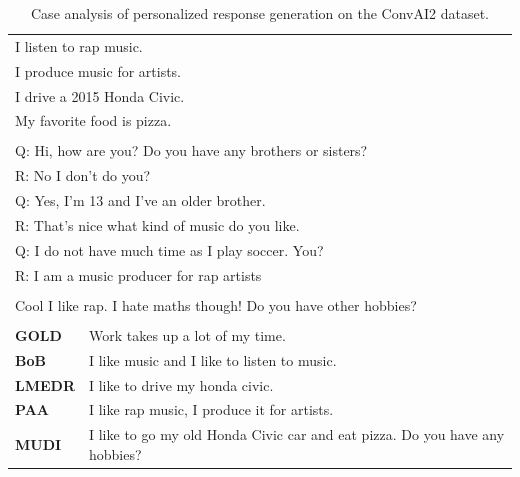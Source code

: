 
\begin{table}[ht]
\centering
\def\arraystretch{1.6}%
\begin{tabular}{|l|p{11cm}|}

\hline
\rowcolor{yellow}
\multicolumn{2}{|c|}{\textbf{Persona}} \\
\hline
\multicolumn{2}{|l|}{I listen to rap music.} \\
\multicolumn{2}{|l|}{I produce music for artists.} \\
\multicolumn{2}{|l|}{I drive a 2015 Honda Civic.} \\
\multicolumn{2}{|l|}{My favorite food is pizza.} \\
\hline

\rowcolor{yellow}
\multicolumn{2}{|c|}{\textbf{Context}} \\
\hline
\multicolumn{2}{|l|}{Q: Hi, how are you? Do you have any brothers or sisters?} \\
\multicolumn{2}{|l|}{R: No I don't do you?} \\
\multicolumn{2}{|l|}{Q: Yes, I'm 13 and I've an older brother.} \\
\multicolumn{2}{|l|}{R: That's nice what kind of music do you like.} \\
\multicolumn{2}{|l|}{Q: I do not have much time as I play soccer. You?} \\
\multicolumn{2}{|l|}{R: I am a music producer for rap artists} \\
\hline

\rowcolor{yellow}
\multicolumn{2}{|c|}{\textbf{Query}} \\
\hline
\multicolumn{2}{|l|}{Cool I like rap. I hate maths though! Do you have other hobbies?} \\

\hhline{|==|}
\rowcolor[RGB]{204,217,245}
\multicolumn{2}{|c|}{\textbf{Response}} \\
\hhline{|==|}
\textbf{GOLD} & Work takes up a lot of my time. \\
\textbf{BoB} & I like music and I like to listen to music. \\
\textbf{LMEDR} & I like to drive my honda civic. \\
\textbf{PAA} & I like rap music, I produce it for artists. \\
\textbf{MUDI} & I like to go my old Honda Civic car and eat pizza. Do you have any hobbies? \\

\hline
\end{tabular}
\caption{Case analysis of personalized response generation on the ConvAI2 dataset.}
\label{table:case_study_3}
\end{table}

